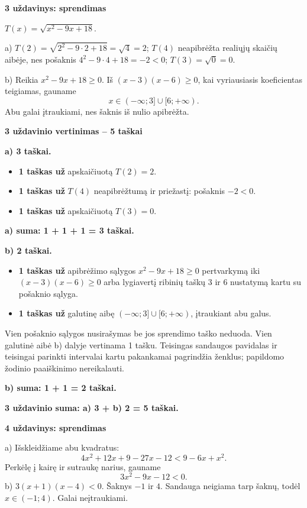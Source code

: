 \documentclass[11pt]{article}
\newcommand{\sk}[1]{\par\medskip\textbf{#1}\par}
\begin{document}
\sk{3 uždavinys: sprendimas}
$T(x)=\sqrt{x^{2} - 9 x + 18}$.
\par a) $T(2)=\sqrt{2^2-9\cdot2+18}=\sqrt4=2$;
$T(4)$ neapibrėžta realiųjų skaičių aibėje, nes pošaknis $4^2-9\cdot4+18=-2<0$;
$T(3)=\sqrt0=0$.
\par b) Reikia $x^{2} - 9 x + 18\ge0$. Iš $(x-3)(x-6)\ge0$, kai vyriausiasis koeficientas teigiamas, gauname
\[x\in(-\infty;3]\cup[6;+\infty).\]
Abu galai įtraukiami, nes šaknis iš nulio apibrėžta.

\sk{3 uždavinio vertinimas -- 5 taškai}
\textbf{a) 3 taškai.}\begin{itemize}
\item \textbf{1 taškas už} apskaičiuotą $T(2)=2$.
\item \textbf{1 taškas už} $T(4)$ neapibrėžtumą ir priežastį: pošaknis $-2<0$.
\item \textbf{1 taškas už} apskaičiuotą $T(3)=0$.
\end{itemize}
\textbf{a) suma: 1 + 1 + 1 = 3 taškai.}\par\textbf{b) 2 taškai.}\begin{itemize}
\item \textbf{1 taškas už} apibrėžimo sąlygos $x^{2} - 9 x + 18\ge0$ pertvarkymą iki $(x-3)(x-6)\ge0$ arba lygiavertį ribinių taškų $3$ ir $6$ nustatymą kartu su pošaknio sąlyga.
\item \textbf{1 taškas už} galutinę aibę $(-\infty;3]\cup[6;+\infty)$, įtraukiant abu galus.
\end{itemize}
Vien pošaknio sąlygos nusirašymas be jos sprendimo taško neduoda. Vien galutinė aibė b) dalyje vertinama 1 tašku. Teisingas sandaugos pavidalas ir teisingai parinkti intervalai kartu pakankamai pagrindžia ženklus; papildomo žodinio paaiškinimo nereikalauti.\par\textbf{b) suma: 1 + 1 = 2 taškai.}\par\textbf{3 uždavinio suma: a) 3 + b) 2 = 5 taškai.}

\sk{4 uždavinys: sprendimas}
a) Išskleidžiame abu kvadratus:
\[4x^2+12x+9-27x-12<9-6x+x^2.\]
Perkėlę į kairę ir sutraukę narius, gauname
\[3 x^{2} - 9 x - 12<0.\]
b) $3(x+1)(x-4)<0$. Šaknys $-1$ ir $4$. Sandauga neigiama tarp šaknų, todėl $\boxed{x\in(-1;4)}$. Galai neįtraukiami.
\end{document}

